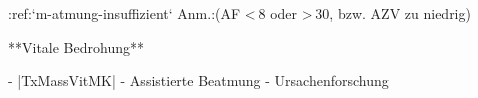 :ref:`m-atmung-insuffizient`
\label{proc:MJ96091C}
Anm.:(AF \textless 8 oder \textgreater 30\PerMin*, bzw. AZV zu niedrig)

**Vitale Bedrohung**
\begin{itemize}
  -   |TxMassVitMK|
  -   Assistierte Beatmung
  -   Ursachenforschung
\end{itemize}
